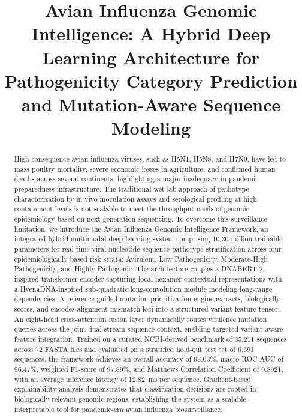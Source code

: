 \documentclass[conference]{IEEEtran}
\begin{document}
\title{Avian Influenza Genomic Intelligence: A Hybrid Deep Learning Architecture for Pathogenicity Category Prediction and Mutation-Aware Sequence Modeling}

\author{
}

\maketitle

\begin{abstract}
High-consequence avian influenza viruses, such as H5N1, H5N8, and H7N9, have led to mass poultry mortality, severe economic losses in agriculture, and confirmed human deaths across several continents, highlighting a major inadequacy in pandemic preparedness infrastructure. The traditional wet-lab approach of pathotype characterization by in vivo inoculation assays and serological profiling at high containment levels is not scalable to meet the throughput needs of genomic epidemiology based on next-generation sequencing. To overcome this surveillance limitation, we introduce the Avian Influenza Genomic Intelligence Framework, an integrated hybrid multimodal deep-learning system comprising 10.30 million trainable parameters for real-time viral nucleotide sequence pathotype stratification across four epidemiologically based risk strata: Avirulent, Low Pathogenicity, Moderate-High Pathogenicity, and Highly Pathogenic. The architecture couples a DNABERT-2-inspired transformer encoder capturing local hexamer contextual representations with a HyenaDNA-inspired sub-quadratic long-convolution module modeling long-range dependencies. A reference-guided mutation prioritization engine extracts, biologically scores, and encodes alignment mismatch loci into a structured variant feature tensor. An eight-head cross-attention fusion layer dynamically routes virulence mutation queries across the joint dual-stream sequence context, enabling targeted variant-aware feature integration. Trained on a curated NCBI-derived benchmark of 35,211 sequences across 72 FASTA files and evaluated on a stratified hold-out test set of 6,691 sequences, the framework achieves an overall accuracy of 98.03\%, macro ROC-AUC of 96.47\%, weighted F1-score of 97.89\%, and Matthews Correlation Coefficient of 0.8921, with an average inference latency of 12.82~ms per sequence. Gradient-based explainability analysis demonstrates that classification decisions are rooted in biologically relevant genomic regions, establishing the system as a scalable, interpretable tool for pandemic-era avian influenza biosurveillance.
\end{abstract}
\end{document}
